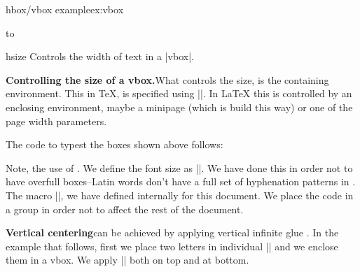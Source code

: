 \begin{texexample}{hbox/vbox example}{ex:vbox}
\noindent\fbox{\vbox{\lorem\par\lorem\par}}

\hbox to \linewidth{\vbox{\lorem\par\lorem\par}}
\end{texexample}


\begin{docCommand}{hsize}{}
 Controls the width of text in a |vbox|.
\end{docCommand}

\noindent\textbf{Controlling the size of a vbox.}\quad What controls the size, is the containing environment. This in TeX, is specified using |\hsize|. In LaTeX this is controlled by an enclosing environment, maybe a minipage (which is build this way) or one of the page width parameters.


\begingroup
\parindent0pt
\hsize=3.9cm\footnotesize
\hfil\fbox{\vbox{\RaggedRight\lorem\par}} 
\hfil\fbox{\vbox{\RaggedRight\lorem\par}}
\hfil\fbox{\vbox{\RaggedRight\lorem\par}}\hfill
\endgroup
{}



The code to typest the boxes shown above follows:
\medskip
{}
\begin{teXXX}
\bgroup
\parindent0pt
\hsize=3.3cm\footnotesize
\hfil\fbox{\vbox{\lorem\par}} 
\hfil\fbox{\vbox{\lorem\par}}
\hfil\fbox{\vbox{\lorem\par}}
\hfill
\egroup
\end{teXXX}


Note, the use of . We define the font size as |\footnotesize|. We have done this in order not to have overfull boxes--Latin words don't have a full set of hyphenation patterns in \latex. The macro |\lorem|, we have defined internally for this document. We place the code in a group in order not to affect the rest of the document.



\clearpage

\noindent\textbf{Vertical centering}\quad can be achieved by applying vertical infinite glue . In the example that follows, first we place two letters in individual |\hboxes| and we enclose them in a vbox. We apply |\vfill| both on top and at bottom.

